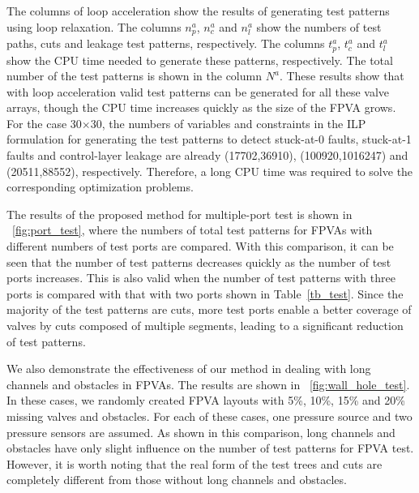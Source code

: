 


The columns of loop acceleration show the results of generating test patterns using
loop relaxation. The columns $n^a_p$, $n^a_c$ and $n^a_l$ show the
numbers of test paths, cuts and leakage test patterns,
respectively.
The columns $t^a_p$, $t^a_c$ and $t^a_l$
show the CPU time needed to generate these patterns, respectively. The total number
of the test patterns is
shown in the column $N^a$. These results show that with loop acceleration 
valid test patterns can be generated for all these valve arrays, though the CPU
time increases quickly as the size of the FPVA grows.
For the case 30$\times$30, 
the numbers of variables and constraints 
in the ILP formulation
for generating the test patterns to detect stuck-at-0 faults, 
stuck-at-1 faults and control-layer leakage are already (17702,36910), 
(100920,1016247) and (20511,88552), respectively. 
Therefore, a long CPU time
was required to solve the corresponding optimization problems.

The results of the proposed method for multiple-port test is shown in
\figname~\ref{fig:port_test}, where 
the numbers of total test patterns for FPVAs with different numbers of test ports
are compared. 
With this comparison, it can be seen that the number of test
patterns decreases quickly as the number of test ports increases. 
This is also valid when the number of test patterns with three ports is compared
with that with two ports shown in Table~\ref{tb_test}.
Since the majority of the test patterns are cuts,
more test ports enable a better coverage of valves by cuts composed of multiple
segments,
leading to a significant reduction of test patterns.

We also 
demonstrate the effectiveness of our method in dealing with long channels
and obstacles in FPVAs. The results are shown in
\figname~\ref{fig:wall_hole_test}. In these cases, we randomly
created FPVA layouts with 5\%, 10\%, 15\% and 20\% missing valves and
obstacles. For each of these cases, one pressure source and two pressure sensors are 
assumed.
As shown in this comparison, long channels and obstacles 
have only slight influence on the number of test patterns for FPVA test.
However, it is worth noting that the real form of the test trees and cuts are
completely different from those without long channels and obstacles. 

